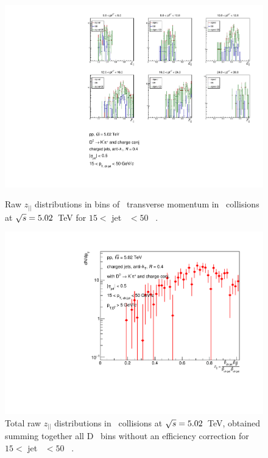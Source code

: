 \begin{figure}[bth]
\centering
\begin{minipage}{.65\textwidth}
  \centering
\includegraphics[width=\textwidth]{pp_2sig/R4_jetbin_15_50/jetRawSpectrum_pTD5}
\caption{Raw $z_{||}$ distributions in bins of \Dzero\ transverse momentum in \pp\ collisions at $\sqrt{s}=5.02$~TeV for $15<$ jet \pt\ $<50$ \GeVc\ .}
\label{fig:eq_pp_signBkgJet_Dzero_15_50_R4}
\end{minipage}%
\begin{minipage}{.4\textwidth}
  \centering
\includegraphics[width=\textwidth]{pp_2sig/R4_jetbin_15_50/jetPtSpectrum_SB_pTD5}
\caption{Total raw $z_{||}$ distributions in \pp\ collisions at $\sqrt{s}=5.02$~TeV, obtained summing together all D \pt\ bins without an efficiency correction for $15<$ jet \pt\ $<50$ \GeVc\ .
}
\label{fig:eq_pp_signBkgJet_tot_15_50_R4}
\end{minipage}
\end{figure}


